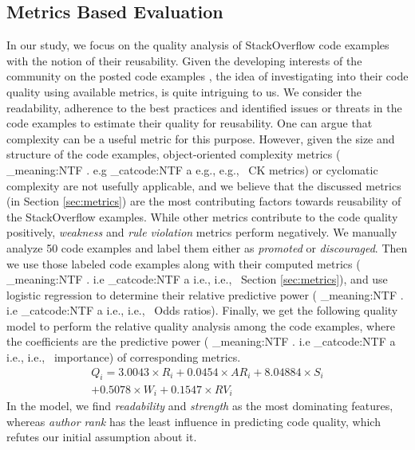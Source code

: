 \documentclass{sig-alternate}
\makeatletter
\newcommand\latinabbrev[1]{
  \peek_meaning:NTF . {%
    #1\@}%
  { \peek_catcode:NTF a {%
      #1., \@ }%
    {#1., \@}}}
\def\eg{\latinabbrev{e.g}}
\def\ie{\latinabbrev{i.e}}
\makeatother
\begin{document}
\subsection{Metrics Based Evaluation}
In our study, we focus on the quality analysis of StackOverflow code examples with the notion of their reusability. Given the developing interests of the community on the posted code examples \cite{nasehi, nier}, the idea of investigating into their code quality using available metrics, is quite intriguing to us. We consider the readability, adherence to the best practices and identified issues or threats in the code examples to estimate their quality for reusability. One can argue that complexity can be a useful metric for this purpose. However, given the size and structure of the code examples, object-oriented complexity metrics (\eg\ CK metrics) or cyclomatic complexity are not usefully applicable, and we believe that the discussed metrics (in Section \ref{sec:metrics}) are the most contributing factors towards reusability of the StackOverflow examples. While other metrics contribute to the code quality positively, \emph{weakness} and \emph{rule violation} metrics perform negatively. We manually analyze 50 code examples and label them either as \emph{promoted} or \emph{discouraged}. Then we use those labeled code examples along with their computed metrics (\ie\ Section \ref{sec:metrics}), and use logistic regression to determine their relative predictive power (\ie\ Odds ratios). Finally, we get the following quality model to perform the relative quality analysis among the code examples, where the coefficients are the predictive power (\ie\ importance) of corresponding metrics.
\begin{equation}\label{eq:model}
\begin{split}
Q_{i}=3.0043\times R_{i}+0.0454\times AR_{i}
+8.04884\times S_{i}\\+0.5078\times W_{i}+0.1547\times RV_{i}
\end{split}
\end{equation}
In the model, we find \emph{readability} and \emph{strength} as the most dominating features, whereas \emph{author rank} has the least influence in predicting code quality, which refutes our initial assumption about it.
\end{document}
